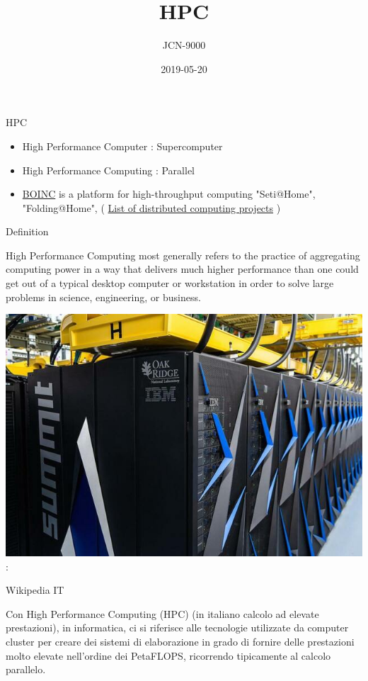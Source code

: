 \documentclass[ignorenonframetext,]{beamer}
\title{HPC}
\author{JCN-9000}
\date{2019-05-20}
\providecommand{\tightlist}{%
  \setlength{\itemsep}{0pt}\setlength{\parskip}{0pt}}
\begin{document}
\frame{\titlepage}

\begin{frame}{HPC}

\begin{itemize}
\item
  High Performance Computer : Supercomputer
\item
  High Performance Computing : Parallel
\item
  \href{https://boinc.berkeley.edu/}{BOINC} is a platform for
  high-throughput computing "Seti@Home", "Folding@Home", (
  \href{https://en.wikipedia.org/wiki/List_of_distributed_computing_projects}{List
  of distributed computing projects} )
\end{itemize}


\end{frame}

\begin{frame}{Definition}

\begin{description}
\tightlist
\item[\href{https://insidehpc.com/hpc-basic-training/what-is-hpc/}{HPC}]
High Performance Computing most generally refers to the practice of
aggregating computing power in a way that delivers much higher
performance than one could get out of a typical desktop computer or
workstation in order to solve large problems in science, engineering, or
business.
\end{description}

\includegraphics{images/Summit_small.jpg} :

\end{frame}

\begin{frame}{Wikipedia IT}

\begin{description}
\tightlist
\item[\href{https://it.wikipedia.org/wiki/High_Performance_Computing}{HPC}]
Con High Performance Computing (HPC) (in italiano calcolo ad elevate
prestazioni), in informatica, ci si riferisce alle tecnologie utilizzate
da computer cluster per creare dei sistemi di elaborazione in grado di
fornire delle prestazioni molto elevate nell'ordine dei PetaFLOPS,
ricorrendo tipicamente al calcolo parallelo.
\end{description}


\end{frame}
\end{document}
